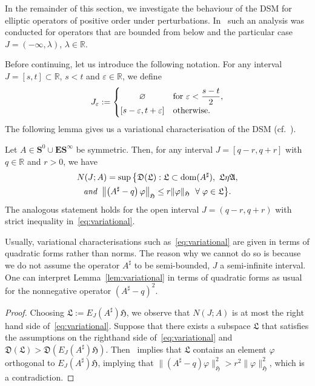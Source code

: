 \documentclass[AHL,Unicode,longabstracts,published]{cedram}
\DeclareMathOperator{\dom}{dom}
\newcommand{\R}{\mathbb R}
\newcommand{\BE}{\mathbf E}
\newcommand{\BS}{\mathbf S}
\newcommand{\FA}{\mathfrak A}
\newcommand{\FD}{\mathfrak D}
\newcommand{\FH}{\mathfrak H}
\newcommand{\FL}{\mathfrak L}
\renewcommand{\phi}{\varphi}
\newcommand{\eps}{\varepsilon}
\let\oldforall\forall
\renewcommand*{\forall}{\mathrel{\oldforall}}
\begin{document}
In the remainder of this section, we investigate the behaviour of the DSM for elliptic operators of positive order under perturbations. In~\cite{MorParSht2014,ParSht2012,ParSht2016} such an analysis was conducted for operators that are bounded from below and the particular case $J = (-\infty,
\lambda)$, $\lambda\in\R$.

Before continuing, let us introduce the following notation. For any interval $J =[s,t]\subset \R$, $s <t$ and $\eps \in\R$, we define
\[
J_{\eps}:=
\begin{cases}
\hfill\varnothing\hfill & \text{for } \eps < \dfrac{s-t}{2}, \\
[s-\eps, t+\eps] & \text{otherwise}.
\end{cases}
\]
The following lemma gives us a variational characterisation of the DSM (cf.~\cite[Lemma~4.1]{ParSht2012}).

\begin{lemm}\label{lem:variational}
Let $A\in \BS^0\cup\BE\BS^\infty$ be symmetric. Then, for any interval $J=[q-r,q+r]$ with $q\in\R$ and $r>0$, we have
\begin{multline}\label{eq:variational}
N(J;A) = \sup\big\{\FD(\FL) : \FL\subset\dom(A^\sharp),\ \FL \eta \FA,
\\\text{\emph{and} }
\left\|\left(A^\sharp-q\right)\phi\right\|_{\FH}\leq r\|\phi\|_\FH \ \forall \phi
\in \FL\big\}.
\end{multline}
The analogous statement holds for the open interval $J=(q-r,q+r)$ with strict inequality in~\eqref{eq:variational}.
\end{lemm}

\begin{rema}
Usually, variational characterisations such as~\eqref{eq:variational} are given in terms of quadratic forms rather than norms. The reason why we cannot do so is because we do not assume the operator $A^\sharp$ to be semi-bounded, $J$ a semi-infinite interval. One can interpret Lemma~\ref{lem:variational} in terms of quadratic forms as usual for the nonnegative operator $(A^\sharp - q)^2$.
\end{rema}

\begin{proof}
Choosing $\FL := E_J(A^\sharp) \FH$, we observe that $N(J;A)$ is at most the right hand side of~\eqref{eq:variational}. Suppose that there exists a subspace $\FL$ that satisfies the assumptions on the righthand side of~\eqref{eq:variational} and $\FD(\FL) > \FD(E_J(A^\sharp)\FH)$. Then~\cite[\S 37.1, Lemma]{Naimark} implies that $\FL$ contains an element $\phi$ orthogonal to $E_J(A^\sharp)\FH$, implying that $\|(A^\sharp-q)\phi\|_{\FH}^2>r^2\|\phi\|_{\FH}^2$, which is a contradiction.
\end{proof}
\end{document}
